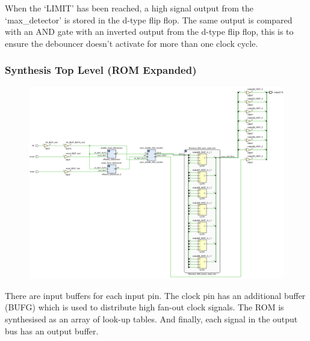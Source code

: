\documentclass[11pt]{report}
\begin{document}
When the `LIMIT' has been reached, a high signal output from the `max\_detector' is stored in the d-type flip flop. The same output is compared with an AND gate with an inverted output from the d-type flip flop, this is to ensure the debouncer doesn't activate for more than one clock cycle.

\subsubsection*{Synthesis Top Level (ROM Expanded)}
\begin{figure}[H]
    \includegraphics[width=\columnwidth]{Reports/Lab1/Schematics/03_synth-tl-rom-expanded.png}
\end{figure}
There are input buffers for each input pin. The clock pin has an additional buffer (BUFG) which is used to distribute high fan-out clock signals. The ROM is synthesised as an array of look-up tables. And finally, each signal in the output bus has an output buffer.
\end{document}
